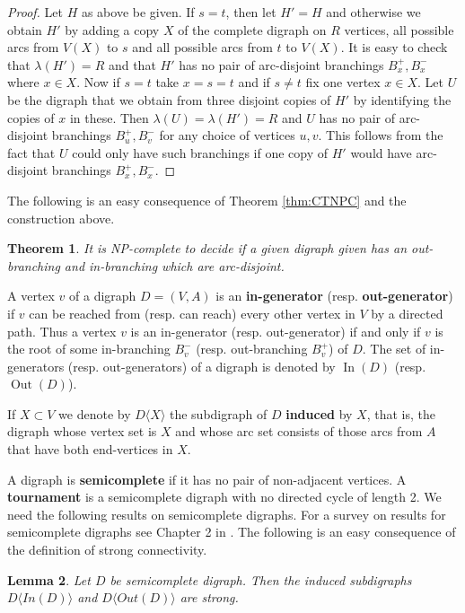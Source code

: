 \documentclass{article}
\newtheorem{theorem}{Theorem}
\newtheorem{lemma}[theorem]{Lemma}
\theoremstyle{definition}
\newcommand{\induce}[2]{#1\langle #2 \rangle}
\DeclareMathOperator{\Out}{Out}
\DeclareMathOperator{\In}{In}
\newcommand{\2}{\vspace{0.2cm}}
\begin{document}
\begin{proof}
Let $H$ as above be given. If $s=t$, then let $H'=H$ and otherwise we
obtain $H'$ by adding a copy $X$ of the complete digraph on $R$
vertices, all possible arcs from $V(X)$ to $s$ and all possible arcs
from $t$ to $V(X)$.  It is easy to check that $\lambda{}(H')=R$ and
that $H'$ has no pair of arc-disjoint branchings $B_x^+,B_x^-$ where
$x\in X$. Now if $s=t$ take $x=s=t$ and if $s\neq t$ fix one vertex
$x\in X$. Let $U$ be the digraph that we obtain from three disjoint
copies of $H'$ by identifying the copies of $x$ in these. Then
$\lambda{}(U)=\lambda{}(H')=R$ and $U$ has no pair of arc-disjoint
branchings $B_u^+,B_v^-$ for any choice of vertices $u,v$. This
follows from the fact that $U$ could only have such branchings if one copy of $H'$
would have arc-disjoint branchings $B_x^+,B_x^-$.
\end{proof}

The following is an easy consequence of Theorem \ref{thm:CTNPC} and
the construction above.

\begin{theorem}
  \label{thm:disjBNPC}
  It is NP-complete to decide if a given digraph given has an
  out-branching and in-branching which are arc-disjoint.
  \end{theorem}

A vertex $v$ of a digraph $D=(V,A)$ is an {\bf
  in-generator} (resp. {\bf out-generator}) if $v$ can be reached from (resp. can
reach) every other vertex in $V$ by a directed path. Thus a vertex $v$
is an in-generator (resp. out-generator) if and only if $v$ is the root of
some in-branching $B_v^-$ (resp. out-branching $B_v^+$) of $D$.  The set of
in-generators (resp. out-generators) of a digraph is denoted by
$\In(D)$ (resp. $\Out(D)$).

If $X\subset V$ we denote by $\induce{D}{X}$ the subdigraph of $D$
{\bf induced} by $X$, that is, the digraph whose vertex set is $X$ and
whose arc set consists of those arcs from $A$ that have both end-vertices in $X$.

A digraph is {\bf semicomplete} if it has no pair of non-adjacent
vertices. A {\bf tournament} is a semicomplete digraph with no directed cycle of length 2. We need the following results on
semicomplete digraphs. For a survey on results for semicomplete
digraphs see Chapter 2 in \cite{bang2018}.  The following is an easy
consequence of the definition of strong connectivity.
\begin{lemma}\label{lem:Instrong}
  Let $D$ be semicomplete digraph. Then the induced subdigraphs $\induce{D}{In(D)}$   and
  $\induce{D}{Out(D)}$ are  strong.
\end{lemma}
\end{document}
